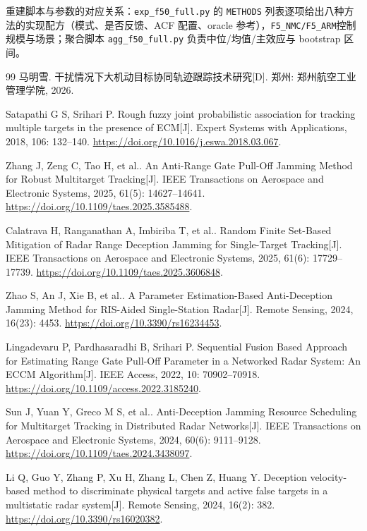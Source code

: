 \documentclass[UTF8,a4paper,zihao=-4]{ctexart}
\begin{document}
重建脚本与参数的对应关系：\texttt{exp\_f50\_full.py} 的 \texttt{METHODS} 列表逐项给出八种方法的实现配方（模式、是否反馈、ACF 配置、oracle 参考），\texttt{F5\_NMC/F5\_ARM}控制规模与场景；聚合脚本 \texttt{agg\_f50\_full.py} 负责中位/均值/主效应与 bootstrap 区间。
{\footnotesize
\begin{thebibliography}{99}
 马明雪. 干扰情况下大机动目标协同轨迹跟踪技术研究[D]. 郑州: 郑州航空工业管理学院, 2026.

 Satapathi G S, Srihari P. Rough fuzzy joint probabilistic association for tracking multiple targets in the presence of ECM[J]. Expert Systems with Applications, 2018, 106: 132--140.
\url{https://doi.org/10.1016/j.eswa.2018.03.067}.

 Zhang J, Zeng C, Tao H, et al.. An Anti-Range Gate Pull-Off Jamming Method for Robust Multitarget Tracking[J]. IEEE Transactions on Aerospace and Electronic Systems, 2025, 61(5): 14627--14641.
\url{https://doi.org/10.1109/taes.2025.3585488}.

 Calatrava H, Ranganathan A, Imbiriba T, et al.. Random Finite Set-Based Mitigation of Radar Range Deception Jamming for Single-Target Tracking[J]. IEEE Transactions on Aerospace and Electronic Systems, 2025, 61(6): 17729--17739.
\url{https://doi.org/10.1109/taes.2025.3606848}.

 Zhao S, An J, Xie B, et al.. A Parameter Estimation-Based Anti-Deception Jamming Method for RIS-Aided Single-Station Radar[J]. Remote Sensing, 2024, 16(23): 4453.
\url{https://doi.org/10.3390/rs16234453}.

 Lingadevaru P, Pardhasaradhi B, Srihari P. Sequential Fusion Based Approach for Estimating Range Gate Pull-Off Parameter in a Networked Radar System: An ECCM Algorithm[J]. IEEE Access, 2022, 10: 70902--70918.
\url{https://doi.org/10.1109/access.2022.3185240}.

 Sun J, Yuan Y, Greco M S, et al.. Anti-Deception Jamming Resource Scheduling for Multitarget Tracking in Distributed Radar Networks[J]. IEEE Transactions on Aerospace and Electronic Systems, 2024, 60(6): 9111--9128.
\url{https://doi.org/10.1109/taes.2024.3438097}.

 Li Q, Guo Y, Zhang P, Xu H, Zhang L, Chen Z, Huang Y. Deception velocity-based method to discriminate physical targets and active false targets in a multistatic radar system[J]. Remote Sensing, 2024, 16(2): 382. \url{https://doi.org/10.3390/rs16020382}.


\end{thebibliography}}
\end{document}
